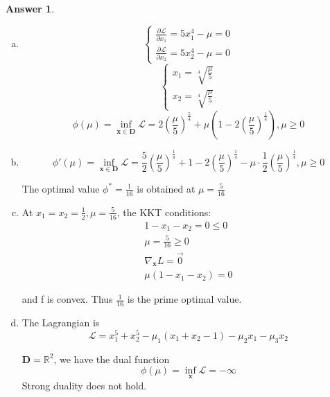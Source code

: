 \documentclass{article}
\theoremstyle{definition}
\newtheorem{ans}{Answer}
\begin{document}
	\begin{ans}
		~
		
		\begin{enumerate}[(a)]
			\item 
			$$
			\left\{\begin{array}{l}
				\frac{\partial \mathcal{L}}{\partial x_1}=5 x_1^4-\mu=0 \\
				\frac{\partial \mathcal{L}}{\partial x_2}=5 x_2^4-\mu=0
			\end{array}\right.
			$$
			$$
			\left\{\begin{array}{l}
				x_1=\sqrt[4]{\frac{\mu}{5}} \\
				x_2=\sqrt[4]{\frac{\mu}{5}}
			\end{array}\right.
			$$
			$$
			\phi(\mu)=\inf _{\boldsymbol{x}\in \boldsymbol{D}} \mathcal{L}=2(\frac{\mu}{5})^{\frac{5}{4}}+\mu(1-2(\frac{\mu}{5})^{\frac{1}{4}}), \mu \geq 0
			$$
			\item 
			$$
			\phi'(\mu)=\inf _{\boldsymbol{x}\in \boldsymbol{D}} \mathcal{L}=\frac{5}{2}(\frac{\mu}{5})^{\frac{1}{4}}+1-2(\frac{\mu}{5})^{\frac{1}{4}}-\mu\cdot\frac{1}{2}(\frac{\mu}{5})^{\frac{1}{4}} , \mu \geq 0
			$$
			
			The optimal value $\phi^*=\frac{1}{16}$ is obtained at $\mu=\frac{5}{16}$
			
			\item
	
			At $x_1=x_2=\frac{1}{2}, \mu=\frac{5}{16}$, the KKT conditions:
			$$
			\begin{aligned}
				1-x_1-x_2=0 \leq 0 \\
				\mu=\frac{5}{16} \geq 0 \\
				\nabla_{\boldsymbol{x}} L=\overrightarrow{0} \\
				\mu\left(1-x_1-x_2\right)=0
			\end{aligned}
			$$
			
			and f is convex. Thus $\frac{1}{16}$ is the prime optimal value. 
			
			\item
			The Lagrangian is
			$$
			\mathcal{L}=x_1^5+x_2^5-\mu_1\left(x_1+x_2-1\right)-\mu_2 x_1-\mu_3 x_2
			$$
			
			$\boldsymbol{D}=\mathbb{R}^2$, we have the dual function
			$$
			\phi(\mu)=\inf _{\boldsymbol{x}} \mathcal{L}=-\infty
			$$
			Strong duality does not hold.
		\end{enumerate}
	\end{ans}
\end{document}
